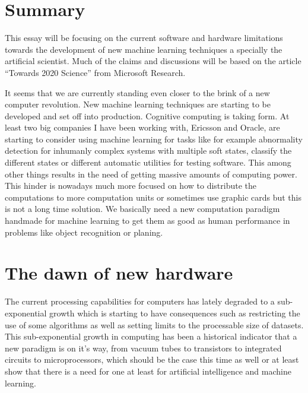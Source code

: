 \documentclass{article}
\begin{document}

\section{Summary}
    This essay will be focusing on the current software and hardware limitations
    towards the development of new machine learning techniques a specially the
    artificial scientist. Much of the claims and discussions will be based on
    the article ``Towards 2020 Science'' from Microsoft Research.\cite{ms2020}

    It seems that we are currently standing even closer to the brink of a new 
    computer revolution. New machine learning techniques are starting to be 
    developed and set off into production. Cognitive computing is taking form.
    At least two big companies I have been working with, Ericsson and Oracle, 
    are starting to consider using machine learning for tasks like for example 
    abnormality detection for inhumanly complex systems with multiple soft
    states, classify the different states or different automatic utilities for
    testing software. This among other things results in the need of getting 
    massive amounts of computing power. This hinder is nowadays much more 
    focused on how to distribute the computations to more computation units or 
    sometimes use graphic cards but this is not a long time solution. We 
    basically need a new computation paradigm handmade for machine learning to 
    get them as good as human performance in problems like object recognition 
    or planing.


\section{The dawn of new hardware}
    The current processing capabilities for computers has lately degraded to a
    sub-exponential growth which is starting to have consequences such as 
    restricting the use of some algorithms as well as setting limits 
    to the processable size of datasets.
    This sub-exponential growth in computing has been a historical indicator
    that a new paradigm is on it's way, from vacuum tubes to transistors to
    integrated circuits to microprocessors, which should be the case this time as
    well or at least show that there is a need for one at least for artificial
    intelligence and machine learning.
    
\end{document}
